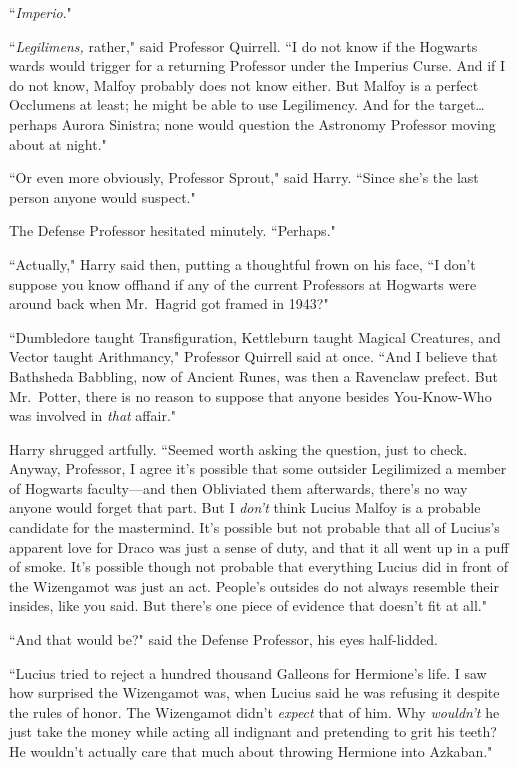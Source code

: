 ``\emph{Imperio}."

``\emph{Legilimens,} rather," said Professor Quirrell. ``I do not know if the Hogwarts wards would trigger for a returning Professor under the Imperius Curse. And if I do not know, Malfoy probably does not know either. But Malfoy is a perfect Occlumens at least; he might be able to use Legilimency. And for the target{\ldots} perhaps Aurora Sinistra; none would question the Astronomy Professor moving about at night."

``Or even more obviously, Professor Sprout," said Harry. ``Since she's the last person anyone would suspect."

The Defense Professor hesitated minutely. ``Perhaps."

``Actually," Harry said then, putting a thoughtful frown on his face, ``I don't suppose you know offhand if any of the current Professors at Hogwarts were around back when Mr.~Hagrid got framed in 1943?"

``Dumbledore taught Transfiguration, Kettleburn taught Magical Creatures, and Vector taught Arithmancy," Professor Quirrell said at once. ``And I believe that Bathsheda Babbling, now of Ancient Runes, was then a Ravenclaw prefect. But Mr.~Potter, there is no reason to suppose that anyone besides You-Know-Who was involved in \emph{that} affair."

Harry shrugged artfully. ``Seemed worth asking the question, just to check. Anyway, Professor, I agree it's possible that some outsider Legilimized a member of Hogwarts faculty—and then Obliviated them afterwards, there's no way anyone would forget that part. But I \emph{don't} think Lucius Malfoy is a probable candidate for the mastermind. It's possible but not probable that all of Lucius's apparent love for Draco was just a sense of duty, and that it all went up in a puff of smoke. It's possible though not probable that everything Lucius did in front of the Wizengamot was just an act. People's outsides do not always resemble their insides, like you said. But there's one piece of evidence that doesn't fit at all."

``And that would be?" said the Defense Professor, his eyes half-lidded.

``Lucius tried to reject a hundred thousand Galleons for Hermione's life. I saw how surprised the Wizengamot was, when Lucius said he was refusing it despite the rules of honor. The Wizengamot didn't \emph{expect} that of him. Why \emph{wouldn't} he just take the money while acting all indignant and pretending to grit his teeth? He wouldn't actually care that much about throwing Hermione into Azkaban."

